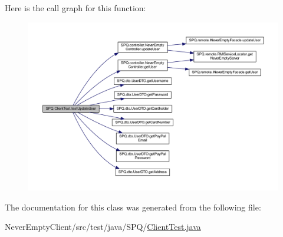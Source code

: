 Here is the call graph for this function\+:\nopagebreak
\begin{figure}[H]
\begin{center}
\leavevmode
\includegraphics[width=350pt]{class_s_p_q_1_1_client_test_ab6d14403cd66b3b0ab32f8022902588f_cgraph}
\end{center}
\end{figure}


The documentation for this class was generated from the following file\+:\begin{DoxyCompactItemize}
\item 
Never\+Empty\+Client/src/test/java/\+S\+P\+Q/\mbox{\hyperlink{_client_test_8java}{Client\+Test.\+java}}\end{DoxyCompactItemize}
